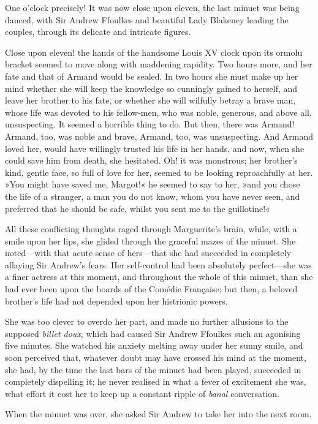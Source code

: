 One o'clock precisely! It was now close upon eleven, the last minuet was being danced, with Sir Andrew Ffoulkes and beautiful Lady Blakeney leading the couples, through its delicate and intricate figures.

Close upon eleven! the hands of the handsome Louis XV clock upon its ormolu bracket seemed to move along with maddening rapidity. Two hours more, and her fate and that of Armand would be sealed. In two hours she must make up her mind whether she will keep the knowledge so cunningly gained to herself, and leave her brother to his fate, or whether she will wilfully betray a brave man, whose life was devoted to his fellow-men, who was noble, generous, and above all, unsuspecting. It seemed a horrible thing to do. But then, there was Armand! Armand, too, was noble and brave, Armand, too, was unsuspecting. And Armand loved her, would have willingly trusted his life in her hands, and now, when she could save him from death, she hesitated. Oh! it was monstrous; her brother's kind, gentle face, so full of love for her, seemed to be looking reproachfully at her. »You might have saved me, Margot!« he seemed to say to her, »and you chose the life of a stranger, a man you do not know, whom you have never seen, and preferred that he should be safe, whilst you sent me to the guillotine!«

All these conflicting thoughts raged through Marguerite's brain, while, with a smile upon her lips, she glided through the graceful mazes of the minuet. She noted—with that acute sense of hers—that she had succeeded in completely allaying Sir Andrew's fears. Her self-control had been absolutely perfect—she was a finer actress at this moment, and throughout the whole of this minuet, than she had ever been upon the boards of the Comédie Française; but then, a beloved brother's life had not depended upon her histrionic powers.

She was too clever to overdo her part, and made no further allusions to the supposed \textit{billet doux}, which had caused Sir Andrew Ffoulkes such an agonising five minutes. She watched his anxiety melting away under her sunny smile, and soon perceived that, whatever doubt may have crossed his mind at the moment, she had, by the time the last bars of the minuet had been played, succeeded in completely dispelling it; he never realised in what a fever of excitement she was, what effort it cost her to keep up a constant ripple of \textit{banal} conversation.

When the minuet was over, she asked Sir Andrew to take her into the next room.

